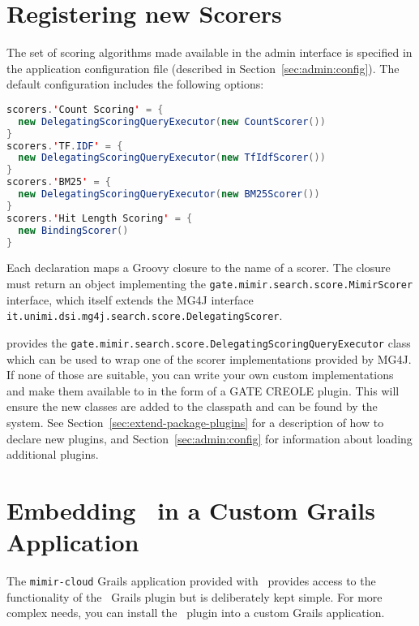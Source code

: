 \section{Registering new Scorers}
\label{sec:extend:scorers}

The set of scoring algorithms made available in the admin interface is specified
in the application configuration file (described in
Section~\ref{sec:admin:config}). The default configuration includes the
following options:
\begin{lstlisting}[language=Java]
scorers.'Count Scoring' = {
  new DelegatingScoringQueryExecutor(new CountScorer())
}
scorers.'TF.IDF' = {
  new DelegatingScoringQueryExecutor(new TfIdfScorer())
}
scorers.'BM25' = {
  new DelegatingScoringQueryExecutor(new BM25Scorer())
}
scorers.'Hit Length Scoring' = {
  new BindingScorer()
}
\end{lstlisting}

Each declaration maps a Groovy closure to the name of a scorer. The closure must
return an object implementing the
\lstinline!gate.mimir.search.score.MimirScorer! interface, which itself extends
the MG4J interface \lstinline!it.unimi.dsi.mg4j.search.score.DelegatingScorer!.

\Mimir{} provides the
\lstinline!gate.mimir.search.score.DelegatingScoringQueryExecutor! class which
can be used to wrap one of the scorer implementations provided by MG4J. If none
of those are suitable, you can write your own custom implementations and make
them available to \Mimir{} in the form of a GATE CREOLE plugin. This will ensure
the new classes are added to the classpath and can be found by the system. See
Section~\ref{sec:extend-package-plugins} for a description of how to declare new
plugins, and Section~\ref{sec:admin:config} for information about loading
additional plugins.
 

\section{Embedding \Mimir\ in a Custom Grails Application}
\label{sec:extend:customapp}

The {\tt mimir-cloud} Grails application provided with \Mimir\ provides access
to the functionality of the \Mimir\ Grails plugin but is deliberately kept
simple. For more complex needs, you can install the \Mimir\ plugin into a custom
Grails application.

